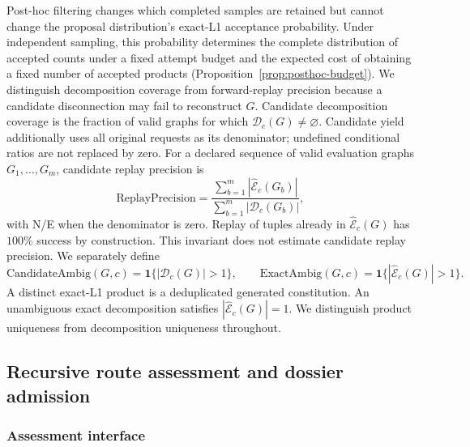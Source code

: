 Post-hoc filtering changes which completed samples are retained but cannot change the proposal
distribution's exact-L1 acceptance probability.
Under independent sampling, this probability determines the complete distribution of accepted
counts under a fixed attempt budget and the expected cost of obtaining a fixed number of accepted
products (Proposition~\ref{prop:posthoc-budget}).
We distinguish decomposition coverage from forward-replay precision because a candidate disconnection
may fail to reconstruct $G$.
Candidate decomposition coverage is the fraction of valid graphs for which
$\mathcal D_c(G)\neq\varnothing$. Candidate yield additionally uses all original requests as
its denominator; undefined conditional ratios are not replaced by zero. For a declared sequence of valid evaluation graphs $G_1,\ldots,G_m$, candidate replay precision is
\begin{equation}
 \mathrm{ReplayPrecision}
 =\frac{\sum_{b=1}^m|\widehat{\mathcal E}_c(G_b)|}
 {\sum_{b=1}^m|\mathcal D_c(G_b)|},
\end{equation}
with N/E when the denominator is zero. Replay of tuples already in
$\widehat{\mathcal E}_c(G)$ has $100\%$ success by construction. This invariant does not estimate
candidate replay precision. We separately define
\begin{equation}
 \mathrm{CandidateAmbig}(G,c)=\mathbf 1\{|\mathcal D_c(G)|>1\},\qquad
 \mathrm{ExactAmbig}(G,c)=\mathbf 1\{|\widehat{\mathcal E}_c(G)|>1\}.
\end{equation}
A distinct exact-L1 product is a deduplicated generated constitution. An unambiguous exact
decomposition satisfies $|\widehat{\mathcal E}_c(G)|=1$. We distinguish product uniqueness from
decomposition uniqueness throughout.

\subsection{Recursive route assessment and dossier admission}
\label{app:route-assessment}

\subsubsection{Assessment interface}

